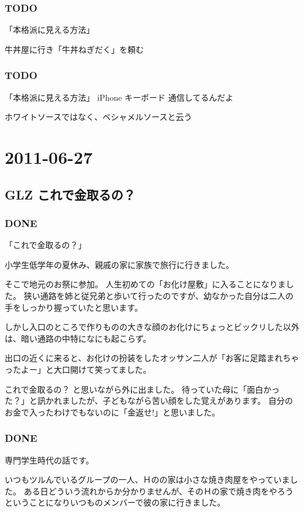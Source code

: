 \documentclass[11pt]{article}
\begin{document}
\subsubsection{\textbf{TODO}}
\label{sec-102_1_1}

「本格派に見える方法」

牛丼屋に行き「牛丼ねぎだく」を頼む
\subsubsection{\textbf{TODO}}
\label{sec-102_1_2}

「本格派に見える方法」
iPhone
キーボード
通信してるんだよ

ホワイトソースではなく、ベシャメルソースと云う
\section{2011-06-27}
\label{sec-103}
\subsection{GLZ これで金取るの？}
\label{sec-103_1}
\subsubsection{\textbf{DONE}}
\label{sec-103_1_1}

「これで金取るの？」

小学生低学年の夏休み、親戚の家に家族で旅行に行きました。

そこで地元のお祭に参加。
人生初めての「お化け屋敷」に入ることになりました。
狭い通路を姉と従兄弟と歩いて行ったのですが、幼なかった自分は二人の手をしっかり握っていたと思います。

しかし入口のところで作りものの大きな顔のお化けにちょっとビックリした以外は、暗い通路の中特になにも起こらず。

出口の近くに来ると、お化けの扮装をしたオッサン二人が「お客に足踏まれちゃったよー」と大口開けて笑ってました。

これで金取るの？ と思いながら外に出ました。
待っていた母に「面白かった？」と訊かれましたが、子どもながら苦い顔をした覚えがあります。
自分のお金で入ったわけでもないのに「金返せ!」と思いました。
\subsubsection{\textbf{DONE}}
\label{sec-103_1_2}

専門学生時代の話です。

いつもツルんでいるグループの一人、Ｈのの家は小さな焼き肉屋をやっていました。
ある日どういう流れからか分かりませんが、そのＨの家で焼き肉をやろうということになりいつものメンバーで彼の家に行きました。
\end{document}
